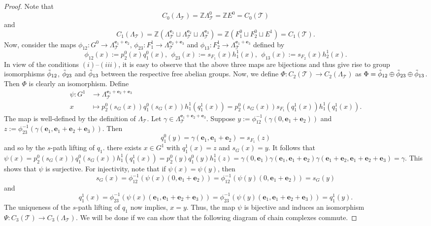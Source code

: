 \documentclass[a4paper,reqno,12pt]{amsart}
\theoremstyle{definition}
\theoremstyle{remark}
\def\mT{\mathcal{T}}
\begin{document}
\begin{proof}
Note that \[C_0(\Lambda_\mT)=\mathbb{Z}\Lambda_\mT^0=\mathbb{Z}E^0=C_0(\mT)\] and \[C_1(\Lambda_\mT)=\mathbb{Z}(\Lambda_\mT^{\mathbf{e}_1}\sqcup \Lambda_\mT^{\mathbf{e}_2}\sqcup \Lambda_\mT^{\mathbf{e}_3})=\mathbb{Z}(F_1^0\sqcup F_2^0\sqcup E^1)=C_1(\mT).\] Now, consider the maps $\phi_{12}:G^0\longrightarrow \Lambda_\mT^{\mathbf{e}_1+\mathbf{e}_2}$, $\phi_{23}:F_1^1\longrightarrow \Lambda_\mT^{\mathbf{e}_2+\mathbf{e}_3}$ and $\phi_{13}:F_2^1\longrightarrow \Lambda_\mT^{\mathbf{e}_1+\mathbf{e}_3}$ defined by \[\phi_{12}(x):=p_2^0(x)q_1^0(x),~~\phi_{23}(x):=s_{F_1}(x)h_1^1(x),~~\phi_{13}(x):=s_{F_2}(x)h_2^1(x).\] In view of the conditions $(i)$--$(iii)$, it is easy to observe that the above three maps are bijections and thus give rise to group isomorphisms $\Tilde{\phi}_{12}$, $\Tilde{\phi}_{23}$ and $\Tilde{\phi}_{13}$ between the respective free abelian groups. Now, we define $\Phi:C_2(\mT)\longrightarrow C_2(\Lambda_\mT)$ as $\Phi=\Tilde{\phi}_{12}\oplus \Tilde{\phi}_{23} \oplus \Tilde{\phi}_{13}$. Then $\Phi$ is clearly an isomorphism. Define 
\begin{align*}
\psi:G^1 &\longrightarrow \Lambda_\mT^{\mathbf{e}_1+\mathbf{e}_2+\mathbf{e}_3}\\
x &\longmapsto p_2^0(s_G(x))q_1^0(s_G(x))h_1^1(q_1^1(x))=p_2^0(s_G(x))s_{F_1}(q_1^1(x))h_1^1(q_1^1(x)).
\end{align*}
The map is well-defined by the definition of $\Lambda_\mT$. Let $\gamma\in \Lambda_\mT^{\mathbf{e}_1+\mathbf{e}_2+\mathbf{e}_3}$. Suppose $y:=\phi_{12}^{-1}(\gamma(0,\mathbf{e}_1+\mathbf{e}_2))$ and $z:=\phi_{23}^{-1}(\gamma(\mathbf{e}_1,\mathbf{e}_1+\mathbf{e}_2+\mathbf{e}_3))$. Then \[q_1^0(y)=\gamma(\mathbf{e}_1,\mathbf{e}_1+\mathbf{e}_2)=s_{F_1}(z)\] and so by the $s$-path lifting of $q_1$. there exists $x\in G^1$ with $q_1^1(x)=z$ and $s_G(x)=y$. It follows that $\psi(x)=p_2^0(s_G(x))q_1^0(s_G(x))h_1^1(q_1^1(x))=p_2^0(y)q_1^0(y)h_1^1(z)=\gamma(0,\mathbf{e}_1)\gamma(\mathbf{e}_1,\mathbf{e}_1+\mathbf{e}_2)\gamma(\mathbf{e}_1+\mathbf{e}_2,\mathbf{e}_1+\mathbf{e}_2+\mathbf{e}_3)=\gamma$. This shows that $\psi$ is surjective. For injectivity, note that if $\psi(x)=\psi(y)$, then \[s_G(x)=\phi_{12}^{-1}(\psi(x)(0,\mathbf{e}_1+\mathbf{e}_2))=\phi_{12}^{-1}(\psi(y)(0,\mathbf{e}_1+\mathbf{e}_2))=s_G(y)\] and \[q_1^1(x)=\phi_{23}^{-1}(\psi(x)(\mathbf{e}_1,\mathbf{e}_1+\mathbf{e}_2+\mathbf{e}_3))=\phi_{23}^{-1}(\psi(y)(\mathbf{e}_1,\mathbf{e}_1+\mathbf{e}_2+\mathbf{e}_3))=q_1^1(y).\] The uniqueness of the $s$-path lifting of $q_1$ now implies, $x=y$. Thus, the map $\psi$ is bijective and induces an isomorphism $\Psi:C_3(\mT)\longrightarrow C_3(\Lambda_\mT)$. We will be done if we can show that the following diagram of chain complexes commute.

\end{proof}
\end{document}
